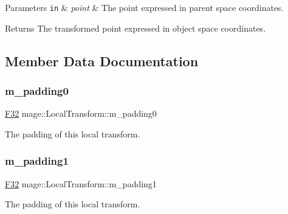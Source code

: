 \begin{DoxyParams}[1]{Parameters}
\mbox{\tt in}  & {\em point} & The point expressed in parent space coordinates. \\
\hline
\end{DoxyParams}
\begin{DoxyReturn}{Returns}
The transformed point expressed in object space coordinates. 
\end{DoxyReturn}


\subsection{Member Data Documentation}
\hypertarget{classmage_1_1_local_transform_a408d86574aca8976ca123b992118c6f8}{}\label{classmage_1_1_local_transform_a408d86574aca8976ca123b992118c6f8} 
\subsubsection{\texorpdfstring{m\+\_\+padding0}{m\_padding0}}
{\footnotesize\ttfamily \hyperlink{namespacemage_aa97e833b45f06d60a0a9c4fc22ae02c0}{F32} mage\+::\+Local\+Transform\+::m\+\_\+padding0\hspace{0.3cm}{\ttfamily [private]}}

The padding of this local transform. \hypertarget{classmage_1_1_local_transform_a3b2b212788e819fb6ac46322c15e002e}{}\label{classmage_1_1_local_transform_a3b2b212788e819fb6ac46322c15e002e} 
\subsubsection{\texorpdfstring{m\+\_\+padding1}{m\_padding1}}
{\footnotesize\ttfamily \hyperlink{namespacemage_aa97e833b45f06d60a0a9c4fc22ae02c0}{F32} mage\+::\+Local\+Transform\+::m\+\_\+padding1\hspace{0.3cm}{\ttfamily [private]}}

The padding of this local transform. \hypertarget{classmage_1_1_local_transform_ad293dda4a1c7bfec90267915937aec90}{}\label{classmage_1_1_local_transform_ad293dda4a1c7bfec90267915937aec90} 
